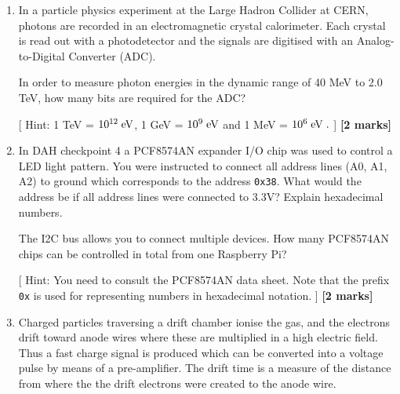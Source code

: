 \begin{enumerate}

\item In a particle physics experiment at the Large Hadron Collider at CERN, photons are recorded in an electromagnetic crystal calorimeter.
Each crystal is read out with a photodetector and the signals are digitised with an Analog-to-Digital Converter (ADC).
%

In order to measure photon energies in the dynamic range of 40 MeV to 2.0 TeV, how many bits are required for the ADC?

[ Hint: 1 TeV = $10^{12}\; \rm eV$, 1 GeV = $10^9\; \rm eV$ and 1 MeV = $10^6\; \rm eV\; .$ ]
%
\hfill {\bf [2 marks]}\\

\item In DAH checkpoint 4 a PCF8574AN expander I/O chip was used to control a LED light pattern.
You were instructed to connect all address lines (A0, A1, A2) to ground which corresponds to the address {\tt 0x38}.
What would the address be if all address lines were connected to 3.3V?
Explain hexadecimal numbers. 

The I2C bus allows you to connect multiple devices.
How many PCF8574AN chips can be controlled in total from one Raspberry Pi?

[ Hint: You need to consult the PCF8574AN data sheet.
Note that the prefix {\tt 0x} is used for representing numbers in hexadecimal notation. ]
%
\hfill {\bf [2 marks]}\\

\item Charged particles traversing a drift chamber ionise the gas, and the electrons drift toward anode wires where these are multiplied in a high electric field.
Thus a fast charge signal is produced which can be converted into a voltage pulse by means of a pre-amplifier. 
The drift time is a measure of the distance from where the the drift electrons were created to the anode wire.


\end{enumerate}
